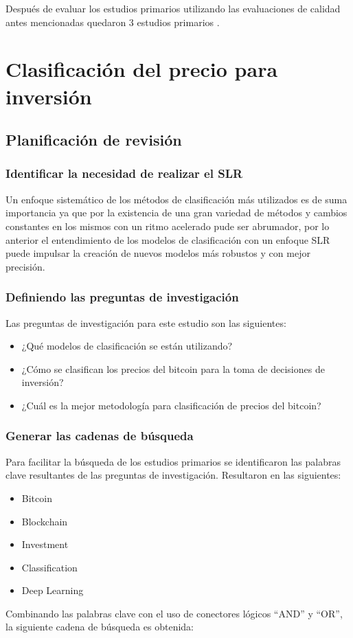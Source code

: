 Después de evaluar los estudios primarios utilizando las evaluaciones de calidad antes mencionadas quedaron 3 estudios primarios \cite{chenMachineLearningModel2021,jiBestFeatureSelection2019,saadCharacterizingBlockchainbasedCryptocurrencies2018}.

\section{Clasificación del precio para inversión}

\subsection{Planificación de revisión}
\subsubsection{Identificar la necesidad de realizar el SLR}

Un enfoque sistemático de los métodos de clasificación más utilizados es de suma importancia ya que por la existencia de una gran variedad de métodos y cambios constantes en los mismos con un ritmo acelerado pude ser abrumador, por lo anterior el entendimiento de los modelos de clasificación con un enfoque SLR puede impulsar la creación de nuevos modelos más robustos y con mejor precisión.\\

\subsubsection{Definiendo las preguntas de investigación}
Las preguntas de investigación para este estudio son las siguientes:
\begin{itemize}
	\item ¿Qué modelos de clasificación se están utilizando?
	\item ¿Cómo se clasifican los precios del bitcoin para la toma de decisiones de inversión?
	\item ¿Cuál es la mejor metodología para clasificación de precios del bitcoin?
\end{itemize}

\subsubsection{Generar las cadenas de búsqueda}
Para facilitar la búsqueda de los estudios primarios se identificaron las palabras clave resultantes de las preguntas de investigación. Resultaron en las siguientes:
\begin{itemize}
	\item Bitcoin
	\item Blockchain
	\item Investment
	\item Classification
	\item Deep Learning
\end{itemize}
Combinando las palabras clave con el uso de conectores lógicos “AND” y “OR”, la siguiente cadena de búsqueda es obtenida:\\


